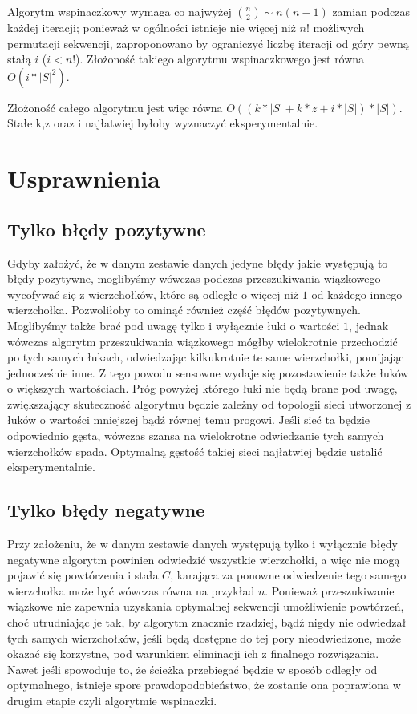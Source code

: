 \documentclass{article}
\begin{document}
Algorytm wspinaczkowy wymaga co najwyżej ${{n}\choose{2}}\sim n(n-1)$ zamian podczas każdej iteracji; ponieważ w ogólności istnieje nie więcej niż $n!$ możliwych permutacji sekwencji, zaproponowano by ograniczyć liczbę iteracji od góry pewną stałą $i$ ($i<n!$). Złożoność takiego algorytmu wspinaczkowego jest równa $O(i*|S|^2)$.

Złożoność całego algorytmu jest więc równa $O((k*|S|+k*z+i*|S|)*|S|)$. Stałe k,z oraz i najłatwiej byłoby wyznaczyć eksperymentalnie.

\section{Usprawnienia}
\subsection{Tylko błędy pozytywne}
Gdyby założyć, że w danym zestawie danych jedyne błędy jakie występują to błędy pozytywne, moglibyśmy wówczas podczas przeszukiwania wiązkowego wycofywać się z wierzchołków, które są odległe o więcej niż $1$ od każdego innego wierzchołka. Pozwoliłoby to ominąć również część błędów pozytywnych. Moglibyśmy także brać pod uwagę tylko i wyłącznie łuki o wartości $1$, jednak wówczas algorytm przeszukiwania wiązkowego mógłby wielokrotnie przechodzić po tych samych łukach, odwiedzając kilkukrotnie te same wierzchołki, pomijając jednocześnie inne. Z tego powodu sensowne wydaje się pozostawienie także łuków o większych wartościach. Próg powyżej którego łuki nie będą brane pod uwagę, zwiększający skuteczność algorytmu będzie zależny od topologii sieci utworzonej z łuków o wartości mniejszej bądź równej temu progowi. Jeśli sieć ta będzie odpowiednio gęsta, wówczas szansa na wielokrotne odwiedzanie tych samych wierzchołków spada. Optymalną gęstość takiej sieci najłatwiej będzie ustalić eksperymentalnie.

\subsection{Tylko błędy negatywne}
Przy założeniu, że w danym zestawie danych występują tylko i wyłącznie błędy negatywne algorytm powinien odwiedzić wszystkie wierzchołki, a więc nie mogą pojawić się powtórzenia i stała $C$, karająca za ponowne odwiedzenie tego samego wierzchołka może być wówczas równa na przykład $n$. Ponieważ przeszukiwanie wiązkowe nie zapewnia uzyskania optymalnej sekwencji umożliwienie powtórzeń, choć utrudniając je tak, by algorytm znacznie rzadziej, bądź nigdy nie odwiedzał tych samych wierzchołków, jeśli będą dostępne do tej pory nieodwiedzone, może okazać się korzystne, pod warunkiem eliminacji ich z finalnego rozwiązania. Nawet jeśli spowoduje to, że ścieżka przebiegać będzie w sposób odległy od optymalnego, istnieje spore prawdopodobieństwo, że zostanie ona poprawiona w drugim etapie czyli algorytmie wspinaczki.
\end{document}
